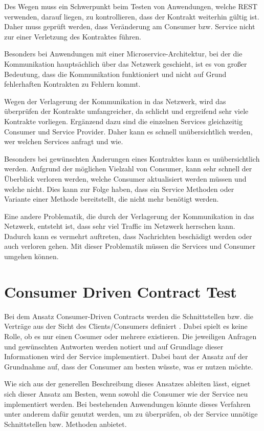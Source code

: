 \documentclass{llncs}
\begin{document}
Des Wegen muss ein Schwerpunkt beim Testen von Anwendungen, welche REST verwenden, darauf liegen, zu kontrollieren, dass der Kontrakt weiterhin gültig ist. Daher muss geprüft werden, dass Veränderung am Consumer bzw. Service nicht zur einer Verletzung des Kontraktes führen.

Besonders bei Anwendungen mit einer Microservice-Architektur, bei der die Kommunikation hauptsächlich über das Netzwerk geschieht, ist es von großer Bedeutung, dass die Kommunikation funktioniert und nicht auf Grund fehlerhaften Kontrakten zu Fehlern kommt.

Wegen der Verlagerung der Kommunikation in das Netzwerk, wird das überprüfen der Kontrakte umfangreicher, da schlicht und ergreifend sehr viele Kontrakte vorliegen. Ergänzend dazu sind die einzelnen Services gleichzeitig Consumer und Service Provider. Daher kann es schnell unübersichtlich werden, wer welchen Services anfragt und wie.

Besonders bei gewünschten Änderungen eines Kontraktes kann es unübersichtlich werden. Aufgrund der möglichen Vielzahl von Consumer, kann  sehr schnell der Überblick verloren werden, welche Consumer aktualisiert werden müssen und welche nicht. Dies kann zur Folge haben, dass ein Service Methoden oder Variante einer Methode bereitstellt, die nicht mehr benötigt werden.

Eine andere Problematik, die durch der Verlagerung der Kommunikation in das Netzwerk, entsteht ist, dass sehr viel Traffic im Netzwerk herrschen kann. Dadurch kann es vermehrt auftreten, dass Nachrichten beschädigt werden oder auch verloren gehen. Mit dieser Problematik müssen die Services und Consumer umgehen können.

\section{Consumer Driven Contract Test}
Bei dem Ansatz Consumer-Driven Contracts werden die Schnittstellen bzw. die Verträge aus der Sicht des Clients/Consumers definiert \cite{Robinson2006}. Dabei spielt es keine Rolle, ob es nur einen Cosumer oder mehrere existieren. Die jeweiligen Anfragen und gewünschten Antworten werden notiert und auf Grundlage dieser Informationen wird der Service implementiert. Dabei baut der Ansatz auf der Grundnahme auf, dass der Consumer am besten wüsste, was er nutzen möchte.

Wie sich aus der generellen Beschreibung dieses Ansatzes ableiten lässt, eignet sich dieser Ansatz am Besten, wenn sowohl die Consumer wie der Service neu implementiert werden. Bei bestehenden Anwendungen könnte dieses Verfahren unter anderem dafür genutzt werden, um zu überprüfen, ob der Service unnötige Schnittstellen bzw. Methoden anbietet.
\end{document}
